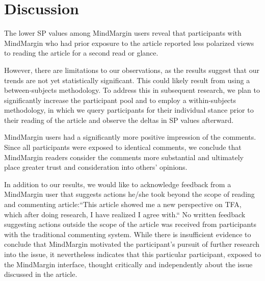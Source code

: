 \section{Discussion}

The lower SP values among MindMargin users reveal that participants with MindMargin who had prior exposure to the article reported less polarized views to reading the article for a second read or glance. 

However, there are limitations to our observations, as the results suggest that our trends are not yet statistically significant. This could likely result from using a between-subjects methodology. To address this in subsequent research, we plan to significantly increase the participant pool and to employ a within-subjects methodology, in which we query participants for their individual stance prior to their reading of the article and observe the deltas in SP values afterward. 

MindMargin users had a significantly more positive impression of the comments. Since all participants were exposed to identical comments, we conclude that MindMargin readers consider the comments more substantial and ultimately place greater trust and consideration into others' opinions.

In addition to our results, we would like to acknowledge feedback from a MindMargin user that suggests actions he/she took beyond the scope of reading and commenting article:``This article showed me a new perspective on TFA, which after doing research, I have realized I agree with.`` No written feedback suggesting actions outside the scope of the article was received from participants with the traditional commenting system. While there is insufficient evidence to conclude that MindMargin motivated the participant's pursuit of further research into the issue, it nevertheless indicates that this particular participant, exposed to the MindMargin interface, thought critically and independently about the issue discussed in the article.